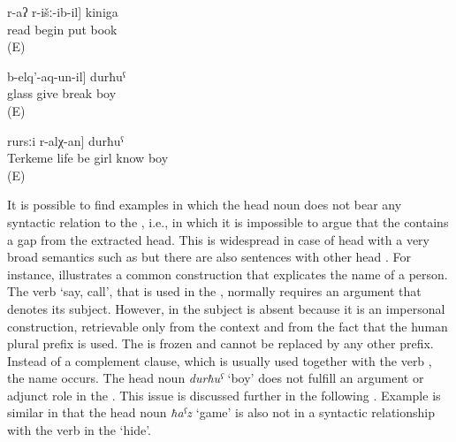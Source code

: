 \begin{exe}
	\ex	\label{ex:the book that I (fem.) started to read}
	\gll	[du	[b-elč'-ij]	r-aʔ	r-išː-ib-il]	kiniga\\
			read	\tsc{f-}begin	put	book\\
	\glt	{} (E)

	\ex	\label{ex:the boy who broke the glass after I gave it to him}
	\gll	[[du-l	istikan	b-ičː-ib-le]	b-elq'-aq-un-il]	durħuˁ\\
			glass	give	break	boy\\
	\glt	{} (E)

	\ex	\label{ex:the boy who know the girl who lives in Terkeme}
	\gll	[[Tarkama-le-r	er	r-irχʷ-an]	rursːi	r-alχ-an]	durħuˁ\\
		Terkeme	life	be	girl	know	boy\\
	\glt	{} (E)
\end{exe}

It is possible to find examples in which the head noun does not bear any syntactic relation to the , i.e., in which it is impossible to argue that the  contains a gap from the extracted head. This is widespread in case of head  with a very broad semantics such as   but there are also sentences with other head . For instance,  illustrates a common construction that explicates the name of a person. The verb  `say, call', that is used in the , normally requires an  argument that denotes its subject. However, in  the subject is absent because it is an impersonal construction, retrievable only from the context and from the fact that the human plural  prefix is used. The   is frozen and cannot be replaced by any other prefix. Instead of a complement clause, which is usually used together with the verb  , the name  occurs. The head noun \textit{durħuˁ} `boy' does not fulfill an argument or adjunct role in the . This issue is discussed further in the following . Example  is similar in that the head noun \textit{ħaˁz} `game' is also not in a syntactic relationship with the verb in the  `hide'.

